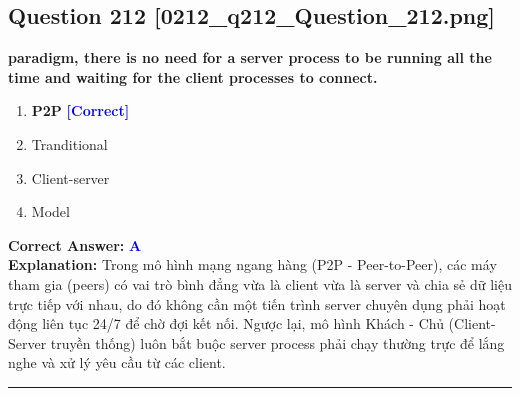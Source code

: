 \documentclass[11pt,a4paper]{article}
\begin{document}
\begin{minipage}{\textwidth}
\subsection*{Question 212 \quad \footnotesize{[0212\_q212\_Question\_212.png]}}
\noindent \textbf{paradigm, there is no need for a server process to be running all the time and waiting for the client processes to connect.}

\begin{enumerate}[label=\Alph*.]
    \item \textbf{P2P} \hfill \textcolor{blue}{\textbf{[Correct]}}
    \item Tranditional
    \item Client-server
    \item Model
\end{enumerate}

\noindent \textbf{Correct Answer:} \textcolor{blue}{\textbf{A}} \\[2pt]
\noindent \textbf{Explanation:} Trong mô hình mạng ngang hàng (P2P - Peer-to-Peer), các máy tham gia (peers) có vai trò bình đẳng vừa là client vừa là server và chia sẻ dữ liệu trực tiếp với nhau, do đó không cần một tiến trình server chuyên dụng phải hoạt động liên tục 24/7 để chờ đợi kết nối. Ngược lại, mô hình Khách - Chủ (Client-Server truyền thống) luôn bắt buộc server process phải chạy thường trực để lắng nghe và xử lý yêu cầu từ các client.

\par\vspace{0.3cm}
\hrule
\vspace{0.3cm}
\end{minipage}
\end{document}
